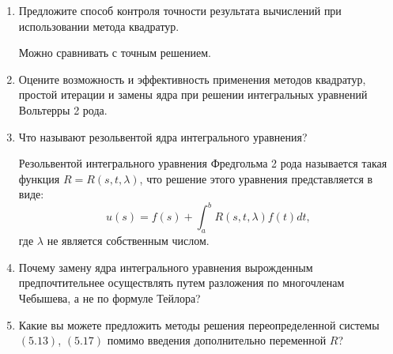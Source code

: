 \documentclass[12pt, a4paper]{article}
\begin{document}
\begin{enumerate}
\item Предложите способ контроля точности результата вычислений при использовании метода квадратур.

Можно сравнивать с точным решением.

\item Оцените возможность и эффективность применения методов квадратур, простой итерации и замены ядра при решении интегральных уравнений Вольтерры 2 рода.

\item Что называют резольвентой ядра интегрального уравнения?

Резольвентой интегрального уравнения Фредгольма 2 рода называется такая функция $ R = R(s, t, \lambda) $, что решение этого уравнения представляется в виде:
\[
u(s) = f(s) + \displaystyle \int_a^b R(s, t, \lambda) f(t) dt,
\]
где $\lambda$ не является собственным числом.
\item Почему замену ядра интегрального уравнения вырожденным предпочтительнее осуществлять путем разложения по многочленам Чебышева, а не по формуле Тейлора?

\item Какие вы можете предложить методы решения переопределенной системы $ (5.13) $, $ (5.17) $ помимо введения дополнительно переменной $ R $?
\end{enumerate}

\newpage
\end{document}
